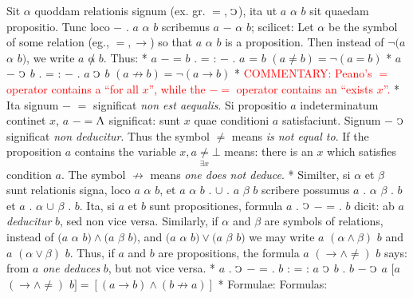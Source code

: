 \documentclass{book}
\newcommand{\C}{\mathop{\sbox0{$\displaystyle$$\reflectbox{C}$} %
\raisebox{-\height+\ht0-0.05cm}[\ht0][\dp0]{\scalebox{0.8}[0.8]{\copy0}}}\displaylimits} %
\newcommand{\abs}{\mathop{\rotatebox[origin=c]{180}{V}}}
\newcommand\commentary[1]{\textcolor{red}{COMMENTARY: #1}}
\newenvironment{translateTwoCol}
               { %
                 \columnratio{0.5, 0.5} \begin{paracol}{2}
                 \newcommand{\LAT}{\switchcolumn[0]*}
                 \newcommand{\ENG}{\switchcolumn[1]}
               }
               { %
                 \let\ENG\undefined
                 \let\LAT\undefined
                 \end{paracol}
               }
\begin{document}
\begin{translateTwoCol}
\quad Sit $\alpha$ quoddam relationis signum (ex. gr. $=$, $\C$), ita ut $a$ $\alpha$ $b$ sit quaedam propositio. Tunc loco $-$ . $a$ $\alpha$ $b$ scribemus $a$ $-$ $\alpha$ $b$; scilicet:
\ENG
\quad Let $\alpha$ be the symbol of some relation (eg., $=, \rightarrow$) so that $a$ $\alpha$ $b$ is a proposition. Then instead of $\neg(a$ $\alpha$ $b)$, we write $a$ $\not\alpha$ $b$. Thus:
\LAT
\hspace{1.06cm} $a$ $-$ = $b$ . = : $-$ . $a$ = $b$
\ENG
\hspace{1.06cm} $(a \not= b) = \neg (a=b)$
\LAT
\hspace{1.06cm} $a$ $-$ $\C$ $b$ . = : $-$ . $a$ $\C$ $b$
\ENG
\hspace{1.06cm} $ (a \not\rightarrow b) = \neg (a \rightarrow b)$
\LAT
\ENG
\commentary{Peano's $=$\scalebox{0.7}{$x$} operator contains a ``for all $x$'', while the $-=$\scalebox{0.7}{$x$} operator contains an ``exists $x$''.}
\LAT
\quad Ita signum $-$ $=$ significat {\emph{non est aequalis}}. Si propositio $a$ indeterminatum continet $x$, $a$ $-=$\scalebox{0.7}{$x$}\thinspace $\abs$ significat: sunt $x$ quae conditioni $a$ satisfaciunt. Signum $-$ $\C$ significat {\emph{non deducitur}}.
\ENG
Thus the symbol $\not=$ means {\emph{is not equal to}}. If the proposition $a$ contains the variable $x, a\underset{\exists x}\neq \bot$ means: there is an $x$ which satisfies condition $a$. The symbol $\not\rightarrow$ means {\emph{one does not deduce}}.
\LAT
\quad Similter, si $\alpha$ et $\beta$ sunt relationis signa, loco $a$ $\alpha$ $b$, et $a$ $\alpha$ $b$ . $\cup$ . $a$ $\beta$ $b$ scribere possumus $a$ . $\alpha$ $\beta$ . $b$ et $a$ . $\alpha$ $\cup$ $\beta$ . $b$. Ita, si $a$ et $b$ sunt propositiones, formula $a$ . $\C$ $-$ = . $b$ dicit: ab $a$ {\emph{deducitur}} $b$, sed non vice versa.
\ENG
\quad Similarly, if $\alpha$ and $\beta$ are symbols of relations, instead of $(a$ $\alpha$ $b) \wedge (a$ $\beta$ $b)$, and $(a$ $\alpha$ $b) \vee (a$ $\beta$ $b)$ we may write $a$ $(\alpha \wedge \beta)$ $b$ and $a$ $(\alpha \vee \beta)$ $b$. Thus, if $a$ and $b$ are propositions, the formula $a$ $(\rightarrow \wedge \not=)$ $b$ says: from $a$ {\emph{one deduces}} $b$, but not vice versa.
\LAT
\hspace{1.06cm} $a$ . $\C$ $-$ = . $b$ : = : $a$ $\C$ $b$ . $b$ $-$ $\C$ $a$
\ENG
\hspace{1.06cm} $[a$ $(\rightarrow \wedge \not=)$ $b] = [(a \rightarrow b) \wedge (b \not\rightarrow a)]$
\LAT
\quad Formulae:
\ENG
\quad Formulas:

\end{translateTwoCol}
\end{document}
